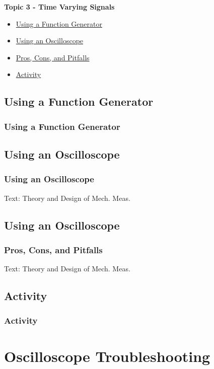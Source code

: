 \documentclass[fleqn]{beamer} %
\newcommand{\sectionIIItitle}{Time Varying Signals}
\newcommand{\sectionIVtitle}{Oscilloscope Troubleshooting}
\newcommand{\sectionIIIsubsectionItitle}{Using a Function Generator}
\newcommand{\sectionIIIsubsectionIItitle}{Using an Oscilloscope}
\newcommand{\sectionIIIsubsectionIIItitle}{Pros, Cons, and Pitfalls}
\newcommand{\sectionIIIsubsectionIVtitle}{Activity}
\begin{document}
		\begin{frame}
			\large \textbf{Topic 3 - \sectionIIItitle} \vspace{3mm}\\

			\begin{itemize}
				\item \hyperlink{sectionIIIsubsectionI}{\sectionIIIsubsectionItitle} \vspc %
				\item \hyperlink{sectionIIIsubsectionII}{\sectionIIIsubsectionIItitle} \vspc %
				\item \hyperlink{sectionIIIsubsectionIII}{\sectionIIIsubsectionIIItitle} \vspc %
				\item \hyperlink{sectionIIIsubsectionIV}{\sectionIIIsubsectionIVtitle} \vspc %
			\end{itemize}
		\end{frame}

		\subsection{\sectionIIIsubsectionItitle}\label{sectionIIIsubsectionI}

			\begin{frame}
				\frametitle{\sectionIIIsubsectionItitle}

				
			\end{frame}

		\subsection{\sectionIIIsubsectionIItitle}\label{sectionIIIsubsectionII}	

			\begin{frame}
				\frametitle{\sectionIIIsubsectionIItitle}

				{\tiny Text: Theory and Design of Mech. Meas.}
			\end{frame}

		\subsection{\sectionIIIsubsectionIItitle}\label{sectionIIIsubsectionIII}

			\begin{frame}
				\frametitle{\sectionIIIsubsectionIIItitle}

			
				{\tiny Text: Theory and Design of Mech. Meas.}
			\end{frame}

		\subsection{\sectionIIIsubsectionIVtitle}\label{sectionIIIsubsectionIV}	

			\begin{frame}
				\frametitle{\sectionIIIsubsectionIVtitle}

			

			\end{frame}



	\section{\sectionIVtitle}\label{sectionIV}
\end{document}
